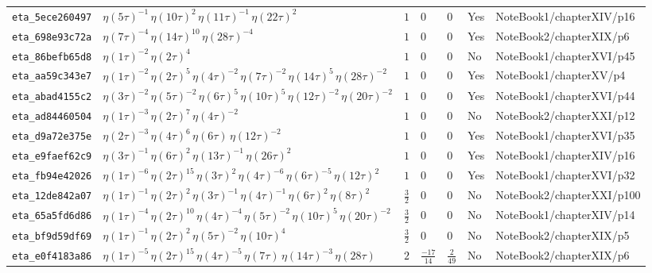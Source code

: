 \documentclass[11pt,twoside,openright]{book}
\begin{document}
\begin{longtable}{p{2.3cm}p{4.3cm}llllp{2.3cm}}
\texttt{eta\_5ece260497} & $\eta(5\tau)^{-1}\, \eta(10\tau)^{2}\, \eta(11\tau)^{-1}\, \eta(22\tau)^{2}$ & $1$ & $0$ & $0$ & Yes & NoteBook1/chapterXIV/p16 \\
\texttt{eta\_698e93c72a} & $\eta(7\tau)^{-4}\, \eta(14\tau)^{10}\, \eta(28\tau)^{-4}$ & $1$ & $0$ & $0$ & Yes & NoteBook2/chapterXIX/p6 \\
\texttt{eta\_86befb65d8} & $\eta(1\tau)^{-2}\, \eta(2\tau)^{4}$ & $1$ & $0$ & $0$ & No & NoteBook1/chapterXVI/p45 \\
\texttt{eta\_aa59c343e7} & $\eta(1\tau)^{-2}\, \eta(2\tau)^{5}\, \eta(4\tau)^{-2}\, \eta(7\tau)^{-2}\, \eta(14\tau)^{5}\, \eta(28\tau)^{-2}$ & $1$ & $0$ & $0$ & Yes & NoteBook1/chapterXV/p4 \\
\texttt{eta\_abad4155c2} & $\eta(3\tau)^{-2}\, \eta(5\tau)^{-2}\, \eta(6\tau)^{5}\, \eta(10\tau)^{5}\, \eta(12\tau)^{-2}\, \eta(20\tau)^{-2}$ & $1$ & $0$ & $0$ & Yes & NoteBook1/chapterXVI/p44 \\
\texttt{eta\_ad84460504} & $\eta(1\tau)^{-3}\, \eta(2\tau)^{7}\, \eta(4\tau)^{-2}$ & $1$ & $0$ & $0$ & No & NoteBook2/chapterXXI/p12 \\
\texttt{eta\_d9a72e375e} & $\eta(2\tau)^{-3}\, \eta(4\tau)^{6}\, \eta(6\tau)\, \eta(12\tau)^{-2}$ & $1$ & $0$ & $0$ & Yes & NoteBook1/chapterXVI/p35 \\
\texttt{eta\_e9faef62c9} & $\eta(3\tau)^{-1}\, \eta(6\tau)^{2}\, \eta(13\tau)^{-1}\, \eta(26\tau)^{2}$ & $1$ & $0$ & $0$ & Yes & NoteBook1/chapterXIV/p16 \\
\texttt{eta\_fb94e42026} & $\eta(1\tau)^{-6}\, \eta(2\tau)^{15}\, \eta(3\tau)^{2}\, \eta(4\tau)^{-6}\, \eta(6\tau)^{-5}\, \eta(12\tau)^{2}$ & $1$ & $0$ & $0$ & Yes & NoteBook1/chapterXVI/p32 \\
\texttt{eta\_12de842a07} & $\eta(1\tau)^{-1}\, \eta(2\tau)^{2}\, \eta(3\tau)^{-1}\, \eta(4\tau)^{-1}\, \eta(6\tau)^{2}\, \eta(8\tau)^{2}$ & $\frac{3}{2}$ & $0$ & $0$ & No & NoteBook2/chapterXXI/p100 \\
\texttt{eta\_65a5fd6d86} & $\eta(1\tau)^{-4}\, \eta(2\tau)^{10}\, \eta(4\tau)^{-4}\, \eta(5\tau)^{-2}\, \eta(10\tau)^{5}\, \eta(20\tau)^{-2}$ & $\frac{3}{2}$ & $0$ & $0$ & No & NoteBook1/chapterXIV/p14 \\
\texttt{eta\_bf9d59df69} & $\eta(1\tau)^{-1}\, \eta(2\tau)^{2}\, \eta(5\tau)^{-2}\, \eta(10\tau)^{4}$ & $\frac{3}{2}$ & $0$ & $0$ & No & NoteBook2/chapterXIX/p5 \\
\texttt{eta\_e0f4183a86} & $\eta(1\tau)^{-5}\, \eta(2\tau)^{15}\, \eta(4\tau)^{-5}\, \eta(7\tau)\, \eta(14\tau)^{-3}\, \eta(28\tau)$ & $2$ & $\frac{-17}{14}$ & $\frac{2}{49}$ & No & NoteBook2/chapterXIX/p6 \\

\end{longtable}
\end{document}
